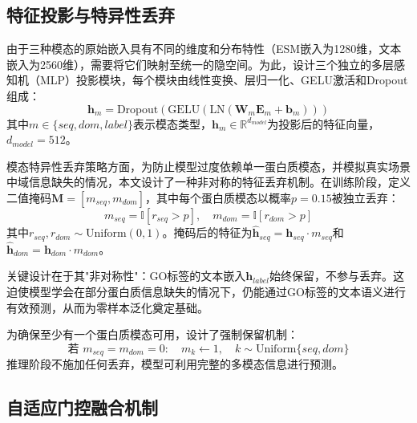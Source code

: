 \subsection{特征投影与特异性丢弃}

由于三种模态的原始嵌入具有不同的维度和分布特性（ESM嵌入为1280维，文本嵌入为2560维），需要将它们映射至统一的隐空间。为此，设计三个独立的多层感知机（MLP）投影模块，每个模块由线性变换、层归一化\cite{ba2016layer}、GELU激活\cite{hendrycks2016gaussian}和Dropout组成：
\begin{equation}
    \mathbf{h}_m = \text{Dropout}(\text{GELU}(\text{LN}(\mathbf{W}_m \mathbf{E}_m + \mathbf{b}_m)))
\end{equation}
其中$m \in \{seq, dom, label\}$表示模态类型，$\mathbf{h}_m \in \mathbb{R}^{d_{model}}$为投影后的特征向量，$d_{model} = 512$。

模态特异性丢弃策略方面，为防止模型过度依赖单一蛋白质模态，并模拟真实场景中域信息缺失的情况，本文设计了一种非对称的特征丢弃机制。在训练阶段，定义二值掩码$\mathbf{M} = [m_{seq}, m_{dom}]$，其中每个蛋白质模态以概率$p = 0.15$被独立丢弃：
\begin{equation}
    m_{seq} = \mathbb{I}[r_{seq} > p], \quad m_{dom} = \mathbb{I}[r_{dom} > p]
\end{equation}
其中$r_{seq}, r_{dom} \sim \text{Uniform}(0, 1)$。掩码后的特征为$\hat{\mathbf{h}}_{seq} = \mathbf{h}_{seq} \cdot m_{seq}$和$\hat{\mathbf{h}}_{dom} = \mathbf{h}_{dom} \cdot m_{dom}$。

关键设计在于其"非对称性"：GO标签的文本嵌入$\mathbf{h}_{label}$始终保留，不参与丢弃。这迫使模型学会在部分蛋白质信息缺失的情况下，仍能通过GO标签的文本语义进行有效预测，从而为零样本泛化奠定基础。

为确保至少有一个蛋白质模态可用，设计了强制保留机制：
\begin{equation}
    \text{若 } m_{seq} = m_{dom} = 0: \quad m_k \leftarrow 1, \quad k \sim \text{Uniform}\{seq, dom\}
\end{equation}
推理阶段不施加任何丢弃，模型可利用完整的多模态信息进行预测。

\subsection{自适应门控融合机制}

